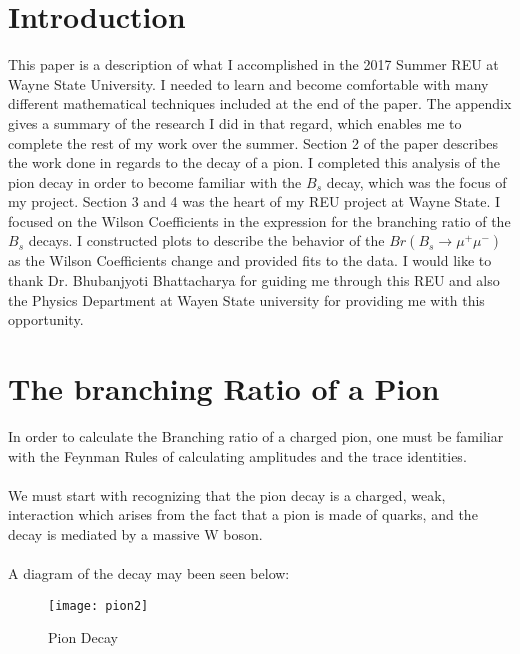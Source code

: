 \documentclass[12pt]{article}
\begin{document}
\tableofcontents

\section{Introduction}
This paper is a description of what I accomplished in the 2017 Summer REU at Wayne State University. I needed to learn and become comfortable with many different mathematical techniques included at the end of the paper. The appendix gives a summary of the research I did in that regard, which enables me to complete the rest of my work over the summer. Section 2 of the paper describes the work done in regards to the decay of a pion. I completed this analysis of the pion decay in order to become familiar with the $B_s$ decay, which was the focus of my project. Section 3 and 4 was the heart of my REU project at Wayne State. I focused on the Wilson Coefficients in the expression for the branching ratio of the $B_s$ decays. I constructed plots to describe the behavior of the $Br(B_s \rightarrow \mu^+\mu^-)$ as the Wilson Coefficients change and provided fits to the data. I would like to thank Dr. Bhubanjyoti Bhattacharya for guiding me through this REU and also the Physics Department at Wayen State university for providing me with this opportunity.     
\newpage
\section{The branching Ratio of a Pion}
In order to calculate the Branching ratio of a charged pion, one must be familiar with the Feynman Rules of calculating amplitudes and the trace identities. \\
\\
We must start with recognizing that the pion decay is a charged, weak, interaction which arises from the fact that a pion is made of quarks, and the decay is mediated by a massive W boson. \\
\\
A diagram of the decay may been seen below: 
\begin{figure}[h]
\centering
\texttt{[image: pion2]}
\caption{Pion Decay}
\end{figure}
\end{document}
